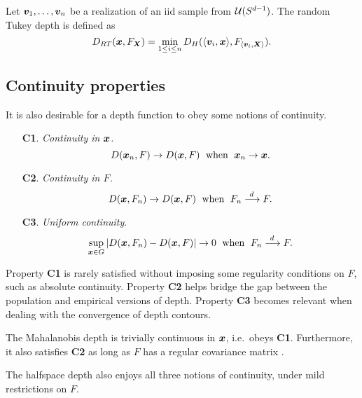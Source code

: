 \begin{definition}
    Let $\bm{v}_1, \dots, \bm{v}_n$ be a realization of an iid sample from $\mathcal{U}(S^{d
    - 1})$.
    The random Tukey depth is defined as
    \begin{equation}
        D_{RT}(\bm{x}, F_{\bm{X}}) = \min_{1 \leq i \leq n} D_H(\langle \bm{v}_i, \bm{x} \rangle, F_{\langle \bm{v}_i, \bm{X} \rangle}).
    \end{equation}
\end{definition}



\subsection{Continuity properties}

It is also desirable for a depth function to obey some notions of continuity.
\begin{enumerate}
    \item[\textbf{C1}.] \emph{Continuity in $\bm{x}$.}
    \begin{equation}
        D(\bm{x}_n, F) \to D(\bm{x}, F)\;\text{ when }\; \bm{x}_n \to \bm{x}.
    \end{equation}

    \item[\textbf{C2}.] \emph{Continuity in $F$.}
    \begin{equation}
        D(\bm{x}, F_n) \to D(\bm{x}, F)\;\text{ when }\; F_n \overset{d\,}{\longrightarrow} F.
    \end{equation}

    \item[\textbf{C3}.] \emph{Uniform continuity}.
    \begin{equation}
        \sup_{\bm{x} \in G} |D(\bm{x}, F_n) - D(\bm{x}, F)| \to 0\;\text{ when }\; F_n \overset{d\,}{\longrightarrow} F.
    \end{equation}
\end{enumerate}

Property \textbf{C1} is rarely satisfied without imposing some regularity
conditions on $F$, such as absolute continuity.
Property \textbf{C2} helps bridge the gap between the population and empirical
versions of depth.
Property \textbf{C3} becomes relevant when dealing with the convergence of
depth contours.


The Mahalanobis depth is trivially continuous in $\bm{x}$, i.e.\ obeys
\textbf{C1}.
Furthermore, it also satisfies \textbf{C2} as long as $F$ has a regular
covariance matrix \parencite{mosler-mozharovskyi-2022}.


The halfspace depth also enjoys all three notions of continuity, under mild
restrictions on $F$.

